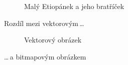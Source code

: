 \documentclass[a4paper,11pt]{article}
\begin{document}
\begin{figure}[h]
{}
\caption{Malý Etiopánek a jeho bratříček}
\label{obr1}
\end{figure}
\newpage

Rozdíl mezi vektorovým\,\dots

\begin{figure}[h]
\centering
{}
\caption{Vektorový obrázek}
\label{obr2}
\end{figure}
\bigskip
\noindent
\dots\,a bitmapovým obrázkem
\end{document}
